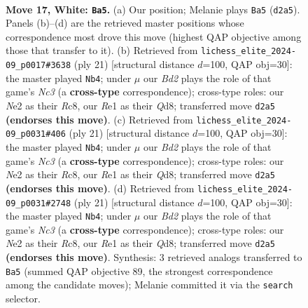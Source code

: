 \documentclass[11pt]{article}
\begin{document}
\clearpage

\begin{figure}[p]\centering
\begin{subfigure}{0.46\textwidth}\centering
\resizebox{\linewidth}{!}{%
\newchessgame
\chessboard[
  setfen={rnr3k1/1p1b1ppp/p1qbpn2/8/7N/3BP3/PP1BNPPP/R2QR1K1 w - - 14 17},
  showmover=false,
  pgfstyle=straightmove, color=movearrow, markmove={d2-a5}
]}
\caption{}
\end{subfigure}\hfill
\begin{subfigure}{0.46\textwidth}\centering
\resizebox{\linewidth}{!}{%
\newchessgame
\chessboard[
  setfen={2rqkb1r/1p3ppp/p1npbn2/8/4PB2/1NN4P/PPP1Q1P1/R3KB1R b KQk - 0 11},
  showmover=false,
  pgfstyle=straightmove, color=movearrow, markmove={c6-b4}
]}
\caption{}
\end{subfigure}
\\[4pt]
\begin{subfigure}{0.46\textwidth}\centering
\resizebox{\linewidth}{!}{%
\newchessgame
\chessboard[
  setfen={2rqkb1r/1p3ppp/p1npbn2/8/4PB2/1NN4P/PPP1Q1P1/R3KB1R b KQk - 0 11},
  showmover=false,
  pgfstyle=straightmove, color=movearrow, markmove={c6-b4}
]}
\caption{}
\end{subfigure}\hfill
\begin{subfigure}{0.46\textwidth}\centering
\resizebox{\linewidth}{!}{%
\newchessgame
\chessboard[
  setfen={2rqkb1r/1p3ppp/p1npbn2/8/4PB2/1NN4P/PPP1Q1P1/R3KB1R b KQk - 0 11},
  showmover=false,
  pgfstyle=straightmove, color=movearrow, markmove={c6-b4}
]}
\caption{}
\end{subfigure}
\caption{\textbf{Move 17, White: \texttt{Ba5}.} (a) Our position; Melanie plays \texttt{Ba5} (\texttt{d2a5}). Panels (b)--(d) are the retrieved master positions whose correspondence most drove this move (highest QAP objective among those that transfer to it). (b) Retrieved from \texttt{lichess\_elite\_2024-09\_p0017\#3638} (ply 21) [structural distance $d$=100, QAP obj=30]: the master played \texttt{Nb4}; under $\mu$ our \emph{Bd2} plays the role of that game's \emph{Nc3} (a \textbf{cross-type} correspondence); cross-type roles: our \emph{N}e2 as their \emph{R}c8, our \emph{R}e1 as their \emph{Q}d8; transferred move \texttt{d2a5} \textbf{(endorses this move)}. (c) Retrieved from \texttt{lichess\_elite\_2024-09\_p0031\#406} (ply 21) [structural distance $d$=100, QAP obj=30]: the master played \texttt{Nb4}; under $\mu$ our \emph{Bd2} plays the role of that game's \emph{Nc3} (a \textbf{cross-type} correspondence); cross-type roles: our \emph{N}e2 as their \emph{R}c8, our \emph{R}e1 as their \emph{Q}d8; transferred move \texttt{d2a5} \textbf{(endorses this move)}. (d) Retrieved from \texttt{lichess\_elite\_2024-09\_p0031\#2748} (ply 21) [structural distance $d$=100, QAP obj=30]: the master played \texttt{Nb4}; under $\mu$ our \emph{Bd2} plays the role of that game's \emph{Nc3} (a \textbf{cross-type} correspondence); cross-type roles: our \emph{N}e2 as their \emph{R}c8, our \emph{R}e1 as their \emph{Q}d8; transferred move \texttt{d2a5} \textbf{(endorses this move)}. Synthesis: 3 retrieved analogs transferred to \texttt{Ba5} (summed QAP objective 89, the strongest correspondence among the candidate moves); Melanie committed it via the \texttt{search} selector.}

\end{figure}
\end{document}
